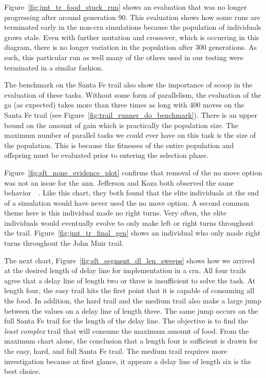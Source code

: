 Figure~\ref{fig:jmt_tr_food_stuck_run} shows an evaluation that was no longer progressing after around generation 90. This evaluation shows how some runs are terminated early in the non-\gls{crn} simulations because the population of individuals grows stale. Even with further mutation and crossover, which is occurring in this diagram, there is no longer variation in the population after 300 generations. As such, this particular run as well many of the others used in our testing were terminated in a similar fashion.

The benchmark on the Santa Fe trail also show the importance of \gls{scoop} in the evaluation of these tasks. Without some form of parallelism, the evaluation of the \gls{ga} (as expected) takes more than three times as long with 400 moves on the Santa Fe trail (see Figure~\ref{fig:trail_runner_do_benchmark}). There is an upper bound on the amount of gain which is practically the population size. The maximum number of parallel tasks we could ever have on this task is the size of the population. This is because the fitnesses of the entire population and offspring must be evaluated prior to entering the selection phase.

Figure~\ref{fig:sft_none_evidence_plot} confirms that removal of the no move option was not an issue for the \gls{ann}. Jefferson and Koza both observed the same behavior~\cite{Jefferson1992-ph}~\cite{Koza1992-xs}. Like this chart, they both found that the elite individuals at the end of a simulation would have never used the no move option. A second common theme here is this individual made no right turns. Very often, the elite individuals would eventually evolve to only make left or right turns throughout the trail. Figure~\ref{fig:jmt_tr_final_gen} shows an individual who only made right turns throughout the John Muir trail.

The next chart, Figure~\ref{fig:sft_segment_dl_len_sweeps} shows how we arrived at the desired length of delay line for implementation in a \gls{crn}. All four trails agree that a delay line of length two or three is insufficient to solve the task. At length four, the easy trail hits the first point that it is capable of consuming all the food. In addition, the hard trail and the medium trail also make a large jump between the values on a delay line of length three. The same jump occurs on the full Santa Fe trail for the length of the delay line. The objective is to find the \textit{least complex} trail that will consume the maximum amount of food. From the maximum chart alone, the conclusion that a length four is sufficient is drawn for the easy, hard, and full Santa Fe trail. The medium trail requires more investigation because at first glance, it appears a delay line of length six is the best choice.

